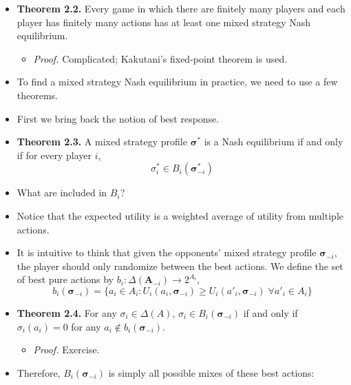 \documentclass[notitlepage]{article}
\begin{document}
\begin{itemize}
\begin{itemize}
    \end{itemize}
    \item \textbf{Theorem 2.2.} Every game in which there are finitely many players and each player has finitely many actions has at least one mixed strategy Nash equilibrium.
    \begin{itemize}
        \item \textit{Proof.} Complicated; Kakutani's fixed-point theorem is used.
    \end{itemize}
    \item To find a mixed strategy Nash equilibrium in practice, we need to use a few theorems.
    \item First we bring back the notion of best response.
    \item \textbf{Theorem 2.3.} A mixed strategy profile \(\boldsymbol{\sigma}^*\) is a Nash equilibrium if and only if for every player \(i\),
    \[
    \sigma^*_i \in B_i(\boldsymbol{\sigma}^*_{-i})
    \]
    \item What are included in \(B_i\)?
    \item Notice that the expected utility is a weighted average of utility from multiple actions.
    \item It is intuitive to think that given the opponents' mixed strategy profile \(\boldsymbol{\sigma}_{-i}\), the player should only randomize between the best actions. We define the set of best pure actions by \(b_i: \Delta(\mathbf{A}_{-i}) \to 2^{A_i}\),
    \[
    b_i(\boldsymbol{\sigma}_{-i}) = \{a_i \in A_i: U_i(a_i,\boldsymbol{\sigma}_{-i}) \ge U_i(a'_i,\boldsymbol{\sigma}_{-i}) \;\forall a'_i \in A_i\}
    \]
    \item \textbf{Theorem 2.4.} For any \(\sigma_i \in \Delta(A)\), \(\sigma_i \in B_i(\boldsymbol{\sigma}_{-i})\) if and only if \(\sigma_i(a_i) = 0\) for any \(a_i \notin b_i(\boldsymbol{\sigma}_{-i})\).
    \begin{itemize}
        \item \textit{Proof.} Exercise.
    \end{itemize}
    \item Therefore, \(B_i(\boldsymbol{\sigma}_{-i})\) is simply all possible mixes of these best actions:

\end{itemize}
\end{document}
